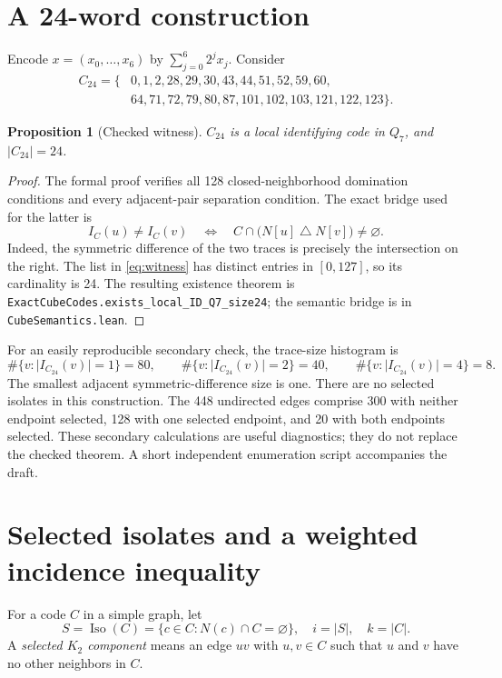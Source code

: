 \documentclass[11pt]{article}
\newtheorem{proposition}[theorem]{Proposition}
\theoremstyle{definition}\newtheorem{definition}[theorem]{Definition}
\theoremstyle{remark}\newtheorem{remark}[theorem]{Remark}
\newcommand{\Q}{Q}
\newcommand{\iso}{\operatorname{Iso}}
\newcommand{\card}[1]{\lvert #1\rvert}
\newcommand{\src}[1]{{\small\nolinkurl{#1}}}
\begin{document}
\section{A 24-word construction}
Encode $x=(x_0,\ldots,x_6)$ by $\sum_{j=0}^6 2^j x_j$. Consider
\begin{equation}\label{eq:witness}
\begin{split}
 C_{24}=\{&0,1,2,28,29,30,43,44,51,52,59,60,\\
          &64,71,72,79,80,87,101,102,103,121,122,123\}.
\end{split}
\end{equation}
\begin{proposition}[Checked witness]\label{prop:witness}
$C_{24}$ is a local identifying code in $\Q_7$, and $\card{C_{24}}=24$.
\end{proposition}
\begin{proof}
The formal proof verifies all 128 closed-neighborhood domination conditions and every adjacent-pair separation condition. The exact bridge used for the latter is
\begin{equation}\label{eq:symmetric}
 I_C(u)\ne I_C(v)\quad\Longleftrightarrow\quad
 C\cap\bigl(N[u]\mathbin{\triangle}N[v]\bigr)\ne\varnothing.
\end{equation}
Indeed, the symmetric difference of the two traces is precisely the intersection on the right. The list in \eqref{eq:witness} has distinct entries in $[0,127]$, so its cardinality is 24. The resulting existence theorem is \src{ExactCubeCodes.exists_local_ID_Q7_size24}; the semantic bridge is in \src{CubeSemantics.lean}.
\end{proof}
For an easily reproducible secondary check, the trace-size histogram is
\[
 \#\{v:\card{I_{C_{24}}(v)}=1\}=80,\qquad
 \#\{v:\card{I_{C_{24}}(v)}=2\}=40,\qquad
 \#\{v:\card{I_{C_{24}}(v)}=4\}=8.
\]
The smallest adjacent symmetric-difference size is one. There are no selected isolates in this construction. The 448 undirected edges comprise 300 with neither endpoint selected, 128 with one selected endpoint, and 20 with both endpoints selected. These secondary calculations are useful diagnostics; they do not replace the checked theorem. A short independent enumeration script accompanies the draft.

\section{Selected isolates and a weighted incidence inequality}
For a code $C$ in a simple graph, let
\[
 S=\iso(C)=\{c\in C:N(c)\cap C=\varnothing\},\quad i=\card S,\quad k=\card C.
\]
A \emph{selected $K_2$ component} means an edge $uv$ with $u,v\in C$ such that $u$ and $v$ have no other neighbors in $C$.
\end{document}
